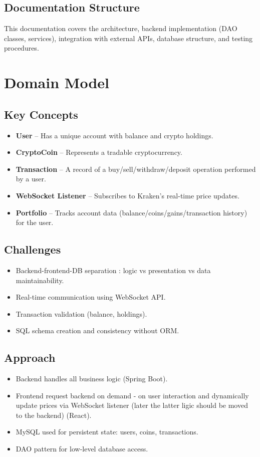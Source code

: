 \documentclass[a4paper,12pt]{article}
\begin{document}
\subsection{Documentation Structure}
This documentation covers the architecture, backend implementation (DAO classes, services), integration with external APIs, database structure, and testing procedures.

\section{Domain Model}
\subsection{Key Concepts}
\begin{itemize}
    \item \textbf{User} – Has a unique account with balance and crypto holdings.
    \item \textbf{CryptoCoin} – Represents a tradable cryptocurrency.
    \item \textbf{Transaction} – A record of a buy/sell/withdraw/deposit operation performed by a user.
    \item \textbf{WebSocket Listener} – Subscribes to Kraken's real-time price updates.
    \item \textbf{Portfolio} – Tracks account data (balance/coins/gains/transaction history) for the user.
\end{itemize}

\subsection{Challenges}
\begin{itemize}
    \item Backend-frontend-DB separation : logic vs presentation vs data maintainability.
    \item Real-time communication using WebSocket API.
    \item Transaction validation (balance, holdings).
    \item SQL schema creation and consistency without ORM.
\end{itemize}

\subsection{Approach}
\begin{itemize}
    \item Backend handles all business logic (Spring Boot).
    \item Frontend request backend on demand - on user interaction and dynamically update prices via WebSocket listener (later the latter ligic should be moved to the backend) (React).
    \item MySQL used for persistent state: users, coins, transactions.
    \item DAO pattern for low-level database access.
\end{itemize}
\end{document}
